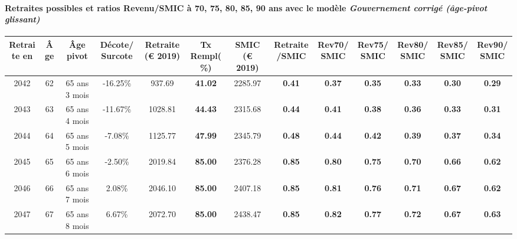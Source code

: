 \paragraph{Retraites possibles et ratios Revenu/SMIC à 70, 75, 80, 85, 90 ans avec le modèle \emph{Gouvernement corrigé (âge-pivot glissant)}}  
 
{ \scriptsize \begin{center} 
\begin{tabular}[htb]{|c|c||c|c||c|c||c||c|c|c|c|c|c|} 
\hline 
 Retraite en &  Âge &  Âge pivot &  Décote/Surcote &  Retraite (\euro{} 2019) &  Tx Rempl(\%) &  SMIC (\euro{} 2019) &  Retraite/SMIC &  Rev70/SMIC &  Rev75/SMIC &  Rev80/SMIC &  Rev85/SMIC &  Rev90/SMIC \\ 
\hline \hline 
 2042 &  62 &  65 ans 3 mois &  -16.25\% &  937.69 &  {\bf 41.02} &  2285.97 &  {\bf {\color{red} 0.41}} &  {\bf {\color{red} 0.37}} &  {\bf {\color{red} 0.35}} &  {\bf {\color{red} 0.33}} &  {\bf {\color{red} 0.30}} &  {\bf {\color{red} 0.29}} \\ 
\hline 
 2043 &  63 &  65 ans 4 mois &  -11.67\% &  1028.81 &  {\bf 44.43} &  2315.68 &  {\bf {\color{red} 0.44}} &  {\bf {\color{red} 0.41}} &  {\bf {\color{red} 0.38}} &  {\bf {\color{red} 0.36}} &  {\bf {\color{red} 0.33}} &  {\bf {\color{red} 0.31}} \\ 
\hline 
 2044 &  64 &  65 ans 5 mois &  -7.08\% &  1125.77 &  {\bf 47.99} &  2345.79 &  {\bf {\color{red} 0.48}} &  {\bf {\color{red} 0.44}} &  {\bf {\color{red} 0.42}} &  {\bf {\color{red} 0.39}} &  {\bf {\color{red} 0.37}} &  {\bf {\color{red} 0.34}} \\ 
\hline 
 2045 &  65 &  65 ans 6 mois &  -2.50\% &  2019.84 &  {\bf 85.00} &  2376.28 &  {\bf {\color{red} 0.85}} &  {\bf {\color{red} 0.80}} &  {\bf {\color{red} 0.75}} &  {\bf {\color{red} 0.70}} &  {\bf {\color{red} 0.66}} &  {\bf {\color{red} 0.62}} \\ 
\hline 
 2046 &  66 &  65 ans 7 mois &  2.08\% &  2046.10 &  {\bf 85.00} &  2407.18 &  {\bf {\color{red} 0.85}} &  {\bf {\color{red} 0.81}} &  {\bf {\color{red} 0.76}} &  {\bf {\color{red} 0.71}} &  {\bf {\color{red} 0.67}} &  {\bf {\color{red} 0.62}} \\ 
\hline 
 2047 &  67 &  65 ans 8 mois &  6.67\% &  2072.70 &  {\bf 85.00} &  2438.47 &  {\bf {\color{red} 0.85}} &  {\bf {\color{red} 0.82}} &  {\bf {\color{red} 0.77}} &  {\bf {\color{red} 0.72}} &  {\bf {\color{red} 0.67}} &  {\bf {\color{red} 0.63}} \\ 
\hline 
\hline 
\end{tabular} 
\end{center} } 

